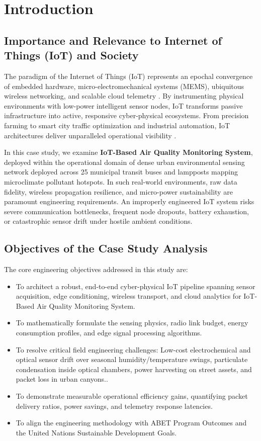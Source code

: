 \section{Introduction}

\subsection{Importance and Relevance to Internet of Things (IoT) and Society}
The paradigm of the Internet of Things (IoT) represents an epochal convergence of embedded hardware, micro-electromechanical systems (MEMS), ubiquitous wireless networking, and scalable cloud telemetry \cite{al2015internet}. By instrumenting physical environments with low-power intelligent sensor nodes, IoT transforms passive infrastructure into active, responsive cyber-physical ecosystems. From precision farming to smart city traffic optimization and industrial automation, IoT architectures deliver unparalleled operational visibility \cite{zanella2014internet}.

In this case study, we examine \textbf{IoT-Based Air Quality Monitoring System}, deployed within the operational domain of dense urban environmental sensing network deployed across 25 municipal transit buses and lampposts mapping microclimate pollutant hotspots. In such real-world environments, raw data fidelity, wireless propagation resilience, and micro-power sustainability are paramount engineering requirements. An improperly engineered IoT system risks severe communication bottlenecks, frequent node dropouts, battery exhaustion, or catastrophic sensor drift under hostile ambient conditions.

\subsection{Objectives of the Case Study Analysis}
The core engineering objectives addressed in this study are:
\begin{itemize}
  \item To architect a robust, end-to-end cyber-physical IoT pipeline spanning sensor acquisition, edge conditioning, wireless transport, and cloud analytics for IoT-Based Air Quality Monitoring System.
  \item To mathematically formulate the sensing physics, radio link budget, energy consumption profiles, and edge signal processing algorithms.
  \item To resolve critical field engineering challenges: Low-cost electrochemical and optical sensor drift over seasonal humidity/temperature swings, particulate condensation inside optical chambers, power harvesting on street assets, and packet loss in urban canyons..
  \item To demonstrate measurable operational efficiency gains, quantifying packet delivery ratios, power savings, and telemetry response latencies.
  \item To align the engineering methodology with ABET Program Outcomes and the United Nations Sustainable Development Goals.
\end{itemize}
